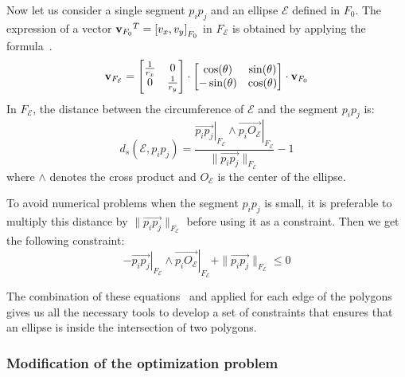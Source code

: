 Now let us consider a single segment $p_i p_j$ and an ellipse $\mathcal{E}$ defined in $F_0$.
The expression of a vector ${{\bf v}_{F_0}}^T = {[v_x, v_y]}_{F_0}$ in $F_\mathcal{E}$ is obtained by applying the formula~.
\begin{equation}
{\bf v}_{F_\mathcal{E}} =
\begin{bmatrix}
\frac{1}{r_x} & 0 \\
0 & \frac{1}{r_y}
\end{bmatrix}
\cdot \begin{bmatrix}
\cos(\theta) & \sin(\theta) \\
-\sin(\theta) & \cos(\theta)
\end{bmatrix}
\cdot {\bf v}_{F_0}
\label{eq:F0-to-FE}
\end{equation}
In $F_\mathcal{E}$, the distance between the circumference of $\mathcal{E}$ and the segment $p_i p_j$ is:
\begin{equation}
  d_s(\mathcal{E}, p_i p_j) = \frac{{\left.\overrightarrow{p_i p_j}\right|}_{F_\mathcal{E}} \wedge {\left.\overrightarrow{p_i O_\mathcal{E}}\right|}_{F_\mathcal{E} } }{\| \overrightarrow{p_i p_j}\|_{F_\mathcal{E} } }-1
\end{equation}
where $\wedge$ denotes the cross product and $O_{\mathcal{E}}$ is the center of the ellipse.

To avoid numerical problems when the segment $p_i p_j$ is small, it is preferable to multiply this distance by $\| \overrightarrow{p_i p_j}\|_{F_\mathcal{E}}$ before using it as a constraint.
Then we get the following constraint:
\begin{equation}
  -{\left.\overrightarrow{p_i p_j}\right|}_{F_\mathcal{E}} \wedge {\left.\overrightarrow{p_i O_\mathcal{E}}\right|}_{F_\mathcal{E}}+\| \overrightarrow{p_i p_j}\|_{F_\mathcal{E}} \leq 0
\label{eq:pseudo-distance}
\end{equation}

The combination of these equations~ and  applied for each edge of the polygons gives us all the necessary tools to develop a set of constraints that ensures that an ellipse is inside the intersection of two polygons.



\subsubsection{Modification of the optimization problem}


